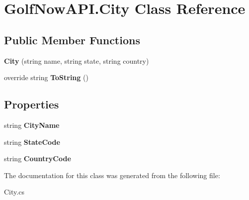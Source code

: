 \hypertarget{class_golf_now_a_p_i_1_1_city}{}\section{Golf\+Now\+A\+P\+I.\+City Class Reference}
\label{class_golf_now_a_p_i_1_1_city}
\subsection*{Public Member Functions}
\begin{DoxyCompactItemize}
\item 
\mbox{\label{class_golf_now_a_p_i_1_1_city_a6bb09becc46cd03bdcdd3973af5a466a}} 
{\bfseries City} (string name, string state, string country)
\item 
\mbox{\label{class_golf_now_a_p_i_1_1_city_a8c791bb09c1d48069be05ee287526011}} 
override string {\bfseries To\+String} ()
\end{DoxyCompactItemize}
\subsection*{Properties}
\begin{DoxyCompactItemize}
\item 
\mbox{\label{class_golf_now_a_p_i_1_1_city_a2e76f4738f5f457d16150a76b62be786}} 
string {\bfseries City\+Name}
\item 
\mbox{\label{class_golf_now_a_p_i_1_1_city_ae13e08b67b6053ec55405f8230dfe0d9}} 
string {\bfseries State\+Code}
\item 
\mbox{\label{class_golf_now_a_p_i_1_1_city_a3c63bfcc234a1b403100e3265b12c55a}} 
string {\bfseries Country\+Code}
\end{DoxyCompactItemize}


The documentation for this class was generated from the following file\+:\begin{DoxyCompactItemize}
\item 
City.\+cs\end{DoxyCompactItemize}
